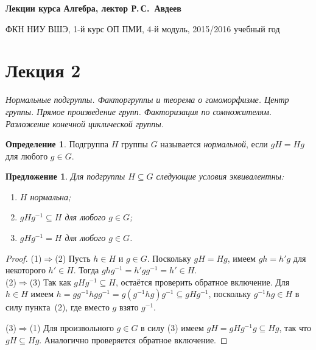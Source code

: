 \documentclass[a4paper,10pt]{amsart}
\newtheorem{proposition}{Предложение}
\theoremstyle{definition}
\newtheorem{definition}{Определение}
\theoremstyle{remark}
\begin{document}
%
\sloppy
%
\centerline{\large \bf Лекции курса \guillemotleft
Алгебра\guillemotright{}, лектор Р.\,С.~Авдеев}

\smallskip

\centerline{\large ФКН НИУ ВШЭ, 1-й курс ОП ПМИ, 4-й модуль,
2015/2016 учебный год}


\bigskip

\section*{Лекция 2}

\medskip

{\it Нормальные подгруппы. Факторгруппы и теорема о гомоморфизме.
Центр группы. Прямое произведение групп. Факторизация по
сомножителям. Разложение конечной циклической группы.}

\medskip

\begin{definition}
Подгруппа $H$ группы $G$ называется {\it нормальной}, если $gH=Hg$
для любого $g\in G$.
\end{definition}

\begin{proposition}
Для подгруппы $H \subseteq G$ следующие условия эквивалентны:

\vspace{-2mm}
\begin{enumerate}
\item[(1)]
$H$ нормальна;

\item[(2)]
$gHg^{-1} \subseteq H$ для любого $g \in G$;

\item[(3)]
$gHg^{-1}=H$ для любого $g\in G$.
\end{enumerate}
\end{proposition}

\vspace{-6mm}

\begin{proof}
(1)$\Rightarrow$(2) Пусть $h \in H$ и $g \in G$. Поскольку $gH =
Hg$, имеем $gh = h'g$ для некоторого $h' \in H$. Тогда $ghg^{-1} =
h'gg^{-1} = h' \in H$.\\
(2)$\Rightarrow$(3) Так как $gHg^{-1} \subseteq H$, остаётся
проверить обратное включение. Для $h \in H$ имеем $h = gg^{-1} h g
g^{-1} = g(g^{-1}hg)g^{-1} \subseteq gHg^{-1}$, поскольку $g^{-1}hg
\in H$ в силу пункта~(2), где вместо $g$ взято $g^{-1}$.

(3)$\Rightarrow$(1) Для произвольного $g \in G$ в силу (3) имеем $gH
= gHg^{-1} g \subseteq Hg$, так что $gH \subseteq Hg$. Аналогично
проверяется обратное включение.
\end{proof}
\vspace{-1mm}
\end{document}
